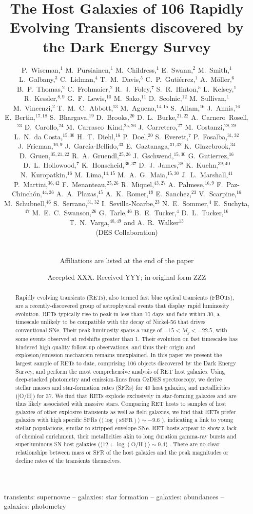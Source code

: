 \documentclass[fleqn,usenatbib,]{mnras}
\title[RET host galaxies in DES]{The Host Galaxies of 106 Rapidly Evolving Transients discovered by the Dark Energy Survey}
\author[P. S. Wiseman]{
\parbox{\textwidth}{
\Large
P.~Wiseman,$^{1}$
M.~Pursiainen,$^{1}$
M.~Childress,$^{1}$
E.~Swann,$^{2}$
M.~Smith,$^{1}$
L.~Galbany,$^{3}$
C.~Lidman,$^{4}$
T.~M.~Davis,$^{5}$
C.~P.~Guti\'errez,$^{1}$
A.~M\"oller,$^{6}$
B.~P.~Thomas,$^{2}$
C.~Frohmaier,$^{2}$
R.~J.~Foley,$^{7}$
S.~R.~Hinton,$^{5}$
L.~Kelsey,$^{1}$
R.~Kessler,$^{8,9}$
G.~F.~Lewis,$^{10}$
M.~Sako,$^{11}$
D.~Scolnic,$^{12}$
M.~Sullivan,$^{1}$
M.~Vincenzi,$^{2}$
T.~M.~C.~Abbott,$^{13}$
M.~Aguena,$^{14,15}$
S.~Allam,$^{16}$
J.~Annis,$^{16}$
E.~Bertin,$^{17,18}$
S.~Bhargava,$^{19}$
D.~Brooks,$^{20}$
D.~L.~Burke,$^{21,22}$
A.~Carnero~Rosell,$^{23}$
D.~Carollo,$^{24}$
M.~Carrasco~Kind,$^{25,26}$
J.~Carretero,$^{27}$
M.~Costanzi,$^{28,29}$
L.~N.~da Costa,$^{15,30}$
H.~T.~Diehl,$^{16}$
P.~Doel,$^{20}$
S.~Everett,$^{7}$
P.~Fosalba,$^{31,32}$
J.~Frieman,$^{16,9}$
J.~Garc\'ia-Bellido,$^{33}$
E.~Gaztanaga,$^{31,32}$
K.~Glazebrook,$^{34}$
D.~Gruen,$^{35,21,22}$
R.~A.~Gruendl,$^{25,26}$
J.~Gschwend,$^{15,30}$
G.~Gutierrez,$^{16}$
D.~L.~Hollowood,$^{7}$
K.~Honscheid,$^{36,37}$
D.~J.~James,$^{38}$
K.~Kuehn,$^{39,40}$
N.~Kuropatkin,$^{16}$
M.~Lima,$^{14,15}$
M.~A.~G.~Maia,$^{15,30}$
J.~L.~Marshall,$^{41}$
P.~Martini,$^{36,42}$
F.~Menanteau,$^{25,26}$
R.~Miquel,$^{43,27}$
A.~Palmese,$^{16,9}$
F.~Paz-Chinch\'{o}n,$^{44,26}$
A.~A.~Plazas,$^{45}$
A.~K.~Romer,$^{19}$
E.~Sanchez,$^{23}$
V.~Scarpine,$^{16}$
M.~Schubnell,$^{46}$
S.~Serrano,$^{31,32}$
I.~Sevilla-Noarbe,$^{23}$
N.~E.~Sommer,$^{4}$
E.~Suchyta,$^{47}$
M.~E.~C.~Swanson,$^{26}$
G.~Tarle,$^{46}$
B.~E.~Tucker,$^{4}$
D.~L.~Tucker,$^{16}$
T.~N.~Varga,$^{48,49}$
and A.~R.~Walker$^{13}$
\begin{center} (DES Collaboration) \end{center}
}
\vspace{0.4cm}
\\
\parbox{\textwidth}{Affiliations are listed at the end of the paper}
}
\date{Accepted XXX. Received YYY; in original form ZZZ}
\newcommand{\replyref}[1]{\color{magenta}#1 \color{black}}
\begin{document}
\label{firstpage}
\pagerange{\pageref{firstpage}--\pageref{lastpage}}
\maketitle

\begin{abstract}
Rapidly evolving transients (RETs), also termed fast blue optical transients (FBOTs), \replyref{are a recently-discovered group of astrophysical events that display rapid luminosity evolution. RETs typically rise to peak in less than 10 days and fade within 30, a timescale unlikely to be compatible with the decay of Nickel-56 that drives conventional SNe. Their peak luminosity spans a range of $-15 <M_g<-22.5$, with some events observed at redshifts greater than 1.} Their evolution on fast timescales has hindered high quality follow-up observations, and thus their origin and explosion/emission mechanism remains unexplained. In this paper we \replyref{present} the largest sample of RETs to date, comprising 106 objects \replyref{discovered by} the Dark Energy Survey, and perform the most comprehensive analysis of RET host galaxies. Using deep-stacked photometry and emission-lines from OzDES spectroscopy, we derive stellar masses and star-formation rates (SFRs) for 49 host galaxies, and metallicities \replyref{([O/H])} for 37. We find that RETs explode exclusively in star-forming galaxies and are thus likely associated with massive stars. Comparing RET hosts to samples of host galaxies of other explosive transients as well as field galaxies, we find that RETs prefer galaxies with high specific SFRs \replyref{($\langle\log \left(\mathrm{sSFR}\right)\rangle \sim -9.6$ ),} indicating a link to young stellar populations, similar to stripped-envelope SNe. RET hosts appear to show a lack of chemical enrichment, their metallicities akin to long duration gamma-ray bursts and superluminous SN host galaxies \replyref{($\langle12+\log\left(\mathrm{O/H}\right) \rangle \sim 9.4$)}. There are no clear relationships between \replyref{mass or SFR} of the host galaxies and the peak magnitudes or decline rates of the transients themselves.

\end{abstract}

\begin{keywords}
transients: supernovae -- galaxies: star formation -- galaxies: abundances -- galaxies: photometry 
\end{keywords}
\end{document}
